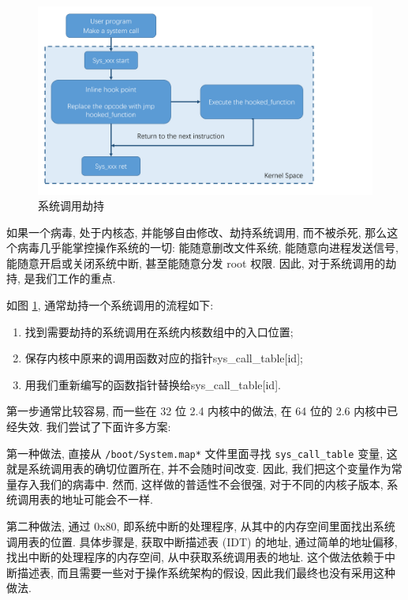 \documentclass[11pt,fleqn]{book} %
\begin{document}
\begin{figure}
\begin{centering}
\includegraphics[width=0.4\paperwidth]{image/syscall_hooking}
\par\end{centering}

\caption{系统调用劫持\label{fig:=007CFB=007EDF=008C03=007528=0052AB=006301}}
\end{figure}


如果一个病毒, 处于内核态, 并能够自由修改、劫持系统调用, 而不被杀死, 那么这个病毒几乎能掌控操作系统的一切: 能随意删改文件系统,
能随意向进程发送信号, 能随意开启或关闭系统中断, 甚至能随意分发 root 权限. 因此, 对于系统调用的劫持, 是我们工作的重点.

如图 \ref{fig:=007CFB=007EDF=008C03=007528=0052AB=006301}, 通常劫持一个系统调用的流程如下:
\begin{enumerate}
\item 找到需要劫持的系统调用在系统内核数组中的入口位置;
\item 保存内核中原来的调用函数对应的指针sys\_call\_table{[}id{]};
\item 用我们重新编写的函数指针替换给sys\_call\_table{[}id{]}.
\end{enumerate}


第一步通常比较容易, 而一些在 32 位 2.4 内核中的做法, 在 64 位的 2.6 内核中已经失效. 我们尝试了下面许多方案:

第一种做法, 直接从 \texttt{/boot/System.map{*}} 文件里面寻找 \texttt{sys\_call\_table}
变量, 这就是系统调用表的确切位置所在, 并不会随时间改变. 因此, 我们把这个变量作为常量存入我们的病毒中. 然而, 这样做的普适性不会很强,
对于不同的内核子版本, 系统调用表的地址可能会不一样.  

第二种做法, 通过 0x80, 即系统中断的处理程序, 从其中的内存空间里面找出系统调用表的位置. 具体步骤是, 获取中断描述表 (IDT)
的地址, 通过简单的地址偏移, 找出中断的处理程序的内存空间, 从中获取系统调用表的地址. 这个做法依赖于中断描述表, 而且需要一些对于操作系统架构的假设,
因此我们最终也没有采用这种做法. 
\end{document}
